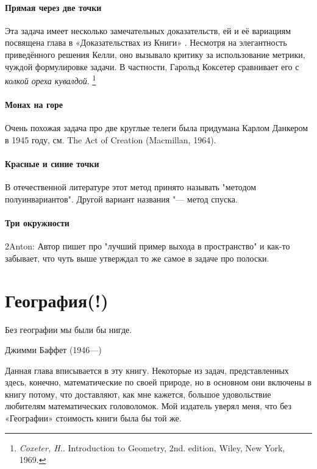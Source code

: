 \documentclass[twoside]{book}
\begin{document}
\subsubsection{Прямая через две точки}
Эта задача имеет несколько замечательных доказательств,
ей и её вариациям посвящена глава в «Доказательствах из  Книги» \cite[глава 10]{the-book}.
Несмотря на элегантность приведённого решения Келли, оно вызывало критику за использование метрики, чуждой формулировке задачи.
В частности, Гарольд  Коксетер сравнивает его с \emph{колкой ореха кувалдой}.
\footnote{\emph{Coxeter, H.}. Introduction to Geometry, 2nd. edition, Wiley, New York, 1969.}

\subsubsection{Монах на горе}
Очень похожая задача про две круглые телеги была придумана Карлом Данкером в 1945 году, см. 
The Act of Creation (Macmillan, 1964). 

\subsubsection{Красные и синие точки}
В отечественной литературе этот метод принято называть "методом полуинвариантов".
Другой вариант названия "--- метод спуска.

\subsubsection{Три окружности}
2Anton: Автор пишет про "лучший пример выхода в пространство" и как-то забывает, 
что чуть выше утверждал то же самое в задаче про полоски.



\chapter{География(!)}

\setlength{\epigraphwidth}{.4\textwidth}
\epigraph{Без географии мы были бы нигде.\vspace{1ex}}{Джимми Баффет (1946---)} 

Данная глава  вписывается в эту книгу.
Некоторые из задач, представленных здесь, конечно, математические по своей природе, %
но в основном они включены в книгу потому, что доставляют, как мне кажется, большое удовольствие любителям математических головоломок.
Мой издатель уверял меня, что без «Географии» стоимость книги была бы той же.
\end{document}
